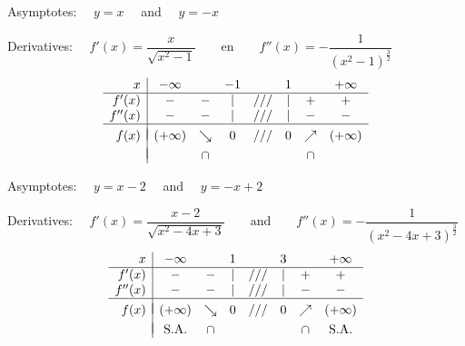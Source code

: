 \begin{Answer}\phantom{}
    
	    \ifcalculus 	
    	\Question Asymptotes: $\quad y=x \quad$ and $\quad y=-x$\par
    		Derivatives: $\quad f'(x)=\dfrac{x}{\sqrt{x^2-1}}\qquad\mbox{en}\qquad f''(x)=-\dfrac{1}{(x^2-1)^\frac{3}{2}}$
    		\[ \begin{array}{r|ccccccc}
    		x & -\infty  &  & -1 &  & 1 & &+\infty \\
    		\hline
    		f'(x)   & - & - & | & /// & | & + & + \\
    		f''(x)  & - & - & | & /// & | & - & - \\
    		\hline
    		&&&&&&&\vspace{-0.3cm}\\
    		f(x)    & (+\infty) & \searrow & 0 & ///& 0 & \nearrow & (+\infty)\\
    		&&&&&&&\vspace{-0.3cm}\\                                                                              
    		& & \cap & & &  & \cap &  \\
    		\end{array}\]
    	\fi
    
    	\Question Asymptotes: $\quad y=x-2\quad$ and $\quad y=-x+2$\par
    		Derivatives: $\quad f'(x)=\dfrac{x-2}{\sqrt{x^2-4x+3}}\qquad\mbox{and}\qquad f''(x)=-\dfrac{1}{(x^2-4x+3)^\frac{3}{2}}$
    		\[ \begin{array}{r|ccccccc}
    		x & -\infty  &  & 1 &  & 3 & &+\infty \\
    		\hline
    		f'(x)   & - & - & | & /// & | & + & + \\
    		f''(x)  & - & - & | & /// & | & - & - \\
    		\hline
    		&&&&&&&\vspace{-0.3cm}\\
    		f(x)    & (+\infty) & \searrow & 0 & ///& 0 & \nearrow & (+\infty)\\
    		&&&&&&&\vspace{-0.3cm}\\                                                                              
    		& \mbox{S.A.} & \cap & & &  & \cap & \mbox{S.A.} \\
    		\end{array}\]
    		

\end{Answer}
